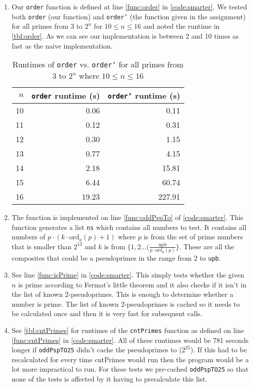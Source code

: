 \documentclass[a4paper]{article}
\begin{document}
\begin{enumerate}
	\item Our \texttt{order} function is defined at line \autoref{func:order} in \autoref{code:smarter}. We tested both \texttt{order} (our function) and \texttt{order'} (the function given in the assignment) for all primes from 3 to $2^n$ for $10 \leq n \leq 16$  and noted the runtime in \autoref{tbl:order}. As we can see our implementation is between 2 and 10 times as fast as the naive implementation.
	
\begin{table}[h]
	\centering
	\caption{Runtimes of \texttt{order} vs. \texttt{order'} for all primes from 3 to $2^n$ where $10 \leq n \leq 16$}
	\label{tbl:order}
	\begin{tabular}{r|r|r}
		$n$ & \texttt{order} runtime (s) & \texttt{order'} runtime (s) \\
		\hline
		10 & 0.06  & 0.11 \\
		11 & 0.12  & 0.31 \\
		12 & 0.30  & 1.15 \\
		13 & 0.77  & 4.15 \\
		14 & 2.18  & 15.81 \\
		15 & 6.44  & 60.74 \\
		16 & 19.23 & 227.91
	\end{tabular}
\end{table}
	\item The function is implemented on line \autoref{func:oddPspTo} of \autoref{code:smarter}. This function generates a list \texttt{ns} which contains all numbers to test. It contains all numbers of $p \cdot (k \cdot \text{ord}_a(p) +1)$ where $p$ is from the set of prime numbers that is smaller than $2^13$ and $k$ is from $\{1, 2 \ldots (\frac{\text{upb}}{p \cdot \text{ord}_a(p)} \}$. These are all the composites that could be a pseudoprimes in the range from 2 to \texttt{upb}.
	\item See line \autoref{func:isPrime} in \autoref{code:smarter}. This simply tests whether the given $n$ is prime according to Fermat's little theorem and it also checks if it isn't in the list of known 2-pseudoprimes. This is enough to determine whether a number is prime. The list of known 2-pseudoprimes is cached so it needs to be calculated once and then it is very fast for subsequent calls.
	\item See \autoref{tbl:cntPrimes} for runtimes of the \texttt{cntPrimes} function as defined on line \autoref{func:cntPrimes} in \autoref{code:smarter}. All of these runtimes would be 781 seconds longer if \texttt{oddPspTO25} didn't cache the pseudoprimes to ($2^25$). If this had to be recalculated for every time cntPrimes would run then the program would be a lot more impractical to run. For these tests we pre-cached \texttt{oddPspTO25} so that none of the tests is affected by it having to precalculate this list.


\end{enumerate}
\end{document}
